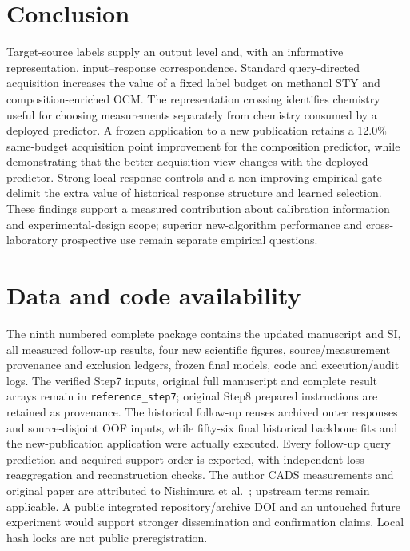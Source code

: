 \documentclass[11pt]{article}
\begin{document}
\section{Conclusion}
Target-source labels supply an output level and, with an informative representation, input--response correspondence. Standard query-directed acquisition increases the value of a fixed label budget on methanol STY and composition-enriched OCM. The representation crossing identifies chemistry useful for choosing measurements separately from chemistry consumed by a deployed predictor. A frozen application to a new publication retains a 12.0\% same-budget acquisition point improvement for the composition predictor, while demonstrating that the better acquisition view changes with the deployed predictor. Strong local response controls and a non-improving empirical gate delimit the extra value of historical response structure and learned selection. These findings support a measured contribution about calibration information and experimental-design scope; superior new-algorithm performance and cross-laboratory prospective use remain separate empirical questions.

\section*{Data and code availability}
The ninth numbered complete package contains the updated manuscript and SI, all measured follow-up results, four new scientific figures, source/measurement provenance and exclusion ledgers, frozen final models, code and execution/audit logs. The verified Step7 inputs, original full manuscript and complete result arrays remain in \texttt{reference\_step7}; original Step8 prepared instructions are retained as provenance. The historical follow-up reuses archived outer responses and source-disjoint OOF inputs, while fifty-six final historical backbone fits and the new-publication application were actually executed. Every follow-up query prediction and acquired support order is exported, with independent loss reaggregation and reconstruction checks. The author CADS measurements and original paper are attributed to Nishimura et al.\ \cite{nishimura2023new}; upstream terms remain applicable. A public integrated repository/archive DOI and an untouched future experiment would support stronger dissemination and confirmation claims. Local hash locks are not public preregistration.


\end{document}
